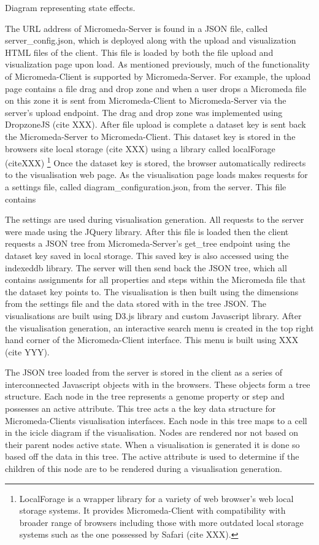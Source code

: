 Diagram representing state effects.

The URL address of Micromeda-Server is found in a JSON file, called server_config.json, which is deployed along with the upload and visualization HTML files of the client. This file is loaded by both the file upload and visualization page upon load. As mentioned previously, much of the functionality of Micromeda-Client is supported by Micromeda-Server. For example, the upload page contains a file drag and drop zone and when a user drops a Micromeda file on this zone it is sent from Micromeda-Client to Micromeda-Server via the server's upload endpoint. The drag and drop zone was implemented using DropzoneJS (cite XXX). After file upload is complete a dataset key is sent back the Micromeda-Server to Micromeda-Client. This dataset key is stored in the browsers site local storage (cite XXX) using a library called localForage (citeXXX) \footnote{LocalForage is a wrapper library for a variety of web browser's web local storage systems. It provides Micromeda-Client with compatibility with broader range of browsers including those with more outdated local storage systems such as the one possessed by Safari (cite XXX).} Once the dataset key is stored, the browser automatically redirects to the visualisation web page. As the visualisation page loads makes requests for a settings file, called diagram_configuration.json, from the server. This file contains 


The settings are used during visualisation generation. All requests to the server were made using the JQuery library. After this file is loaded then the client requests a JSON tree from Micromeda-Server's get\_tree endpoint using the dataset key saved in local storage. This saved key is also accessed using the indexeddb library. The server will then send back the JSON tree, which all contains assignments for all properties and steps within the Micromeda file that the dataset key points to. The visualisation is then built using the dimensions from the settings file and the data stored with in the tree JSON. The visualisations are built using D3.js library and custom Javascript library. After the visualisation generation, an interactive search menu is created in the top right hand corner of the Micromeda-Client interface. This menu is built using XXX (cite YYY).


The JSON tree loaded from the server is stored in the client as a series of interconnected Javascript objects with in the browsers. These objects form a tree structure. Each node in the tree represents a genome property or step and possesses an active attribute. This tree acts a the key data structure for Micromeda-Clients visualisation interfaces. Each node in this tree maps to a cell in the icicle diagram if the visualisation. Nodes are rendered nor not based on their parent nodes active state. When a visualisation is generated it is done so based off the data in this tree. The active attribute is used to determine if the children of this node are to be rendered during a visualisation generation. 

